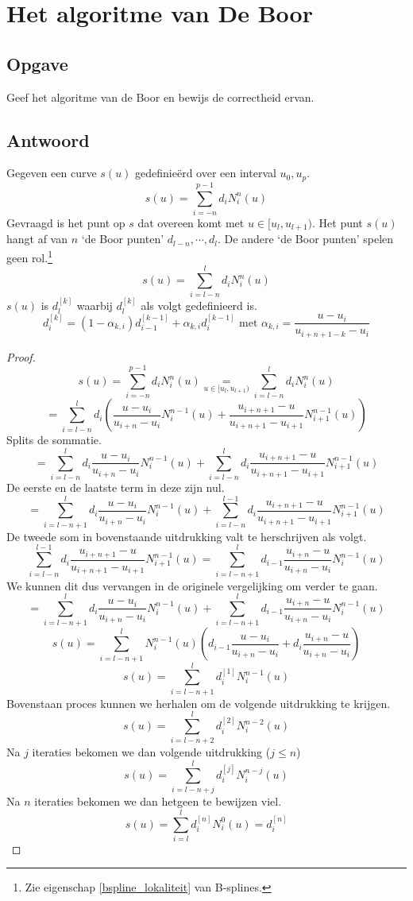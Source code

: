 \documentclass[examenvragen.tex]{subfiles}
\begin{document}
\section{Het algoritme van De Boor}
\subsection{Opgave}
Geef het algoritme van de Boor en bewijs de correctheid ervan.

\subsection{Antwoord}

Gegeven een curve $s(u)$ gedefinie\"erd over een interval $u_0,u_p$. 
\[
s(u) = \sum_{i=-n}^{p-1}d_iN_{i}^{n}(u)
\]
Gevraagd is het punt op $s$ dat overeen komt met $u\in [u_l,u_{l+1})$. Het punt $s(u)$ hangt af van $n$ `de Boor punten' $d_{l-n},\cdots,d_{l}$. De andere `de Boor punten' spelen geen rol.\footnote{Zie eigenschap \ref{bspline_lokaliteit} van B-splines.}
\[
s(u) = \sum_{i=l-n}^{l}d_{i}N_{i}^{n}(u)
\]
$s(u)$ is $d_{l}^{[k]}$ waarbij $d_{l}^{[k]}$ als volgt gedefinieerd is.
\[
d_{i}^{[k]}
= (1-\alpha_{k,i})d_{i-1}^{[k-1]}
+ \alpha_{k,i}d_{i}^{[k-1]}
\text{ met }
\alpha_{k,i} = \frac{u-u_i}{u_{i+n+1-k}-u_{i}}
\]

\begin{proof}
\[
s(u)
= \sum_{i=-n}^{p-1}d_iN_{i}^{n}(u)
\underset{u \in [u_l,u_{l+1})}{=}
\sum_{i=l-n}^{l}d_iN_{i}^{n}(u)
\]
\[
=
\sum_{i=l-n}^{l}d_i
\left(
\frac{u-u_i}{u_{i+n}-u_i}N_i^{n-1}(u) + 
\frac{u_{i+n+1}-u}{u_{i+n+1}-u_{i+1}}N_{i+1}^{n-1}(u)
\right)
\]
Splits de sommatie.
\[
=
\sum_{i=l-n}^{l}d_i
\frac{u-u_i}{u_{i+n}-u_i}N_i^{n-1}(u) + 
\sum_{i=l-n}^{l}d_i
\frac{u_{i+n+1}-u}{u_{i+n+1}-u_{i+1}}N_{i+1}^{n-1}(u)
\]
De eerste en de laatste term in deze zijn nul.
\[
=
\sum_{i=l-n+1}^{l}d_i
\frac{u-u_i}{u_{i+n}-u_i}N_i^{n-1}(u) + 
\sum_{i=l-n}^{l-1}d_i
\frac{u_{i+n+1}-u}{u_{i+n+1}-u_{i+1}}N_{i+1}^{n-1}(u)
\]
De tweede som in bovenstaande uitdrukking valt te herschrijven als volgt.
\[
\sum_{i=l-n}^{l-1}d_i
\frac{u_{i+n+1}-u}{u_{i+n+1}-u_{i+1}}N_{i+1}^{n-1}(u)
=
\sum_{i=l-n+1}^{l}d_{i-1}
\frac{u_{i+n}-u}{u_{i+n}-u_{i}}N_{i}^{n-1}(u)
\]
We kunnen dit dus vervangen in de originele vergelijking om verder te gaan.
\[
=
\sum_{i=l-n+1}^{l}d_i
\frac{u-u_i}{u_{i+n}-u_i}N_i^{n-1}(u) + 
\sum_{i=l-n+1}^{l}d_{i-1}
\frac{u_{i+n}-u}{u_{i+n}-u_{i}}N_{i}^{n-1}(u)
\]
\[
s(u)
=
\sum_{i=l-n+1}^{l}
N_i^{n-1}(u)
\left(
d_{i-1}
\frac{u-u_i}{u_{i+n}-u_i} +
d_i
\frac{u_{i+n}-u}{u_{i+n}-u_{i}}
\right)
\]
\[
s(u)
= \sum_{i=l-n+1}^{l}
d_{i}^{[1]}
N_i^{n-1}(u)
\]
Bovenstaan proces kunnen we herhalen om de volgende uitdrukking te krijgen.
\[
s(u)
= \sum_{i=l-n+2}^{l}
d_{i}^{[2]}
N_i^{n-2}(u)
\]
Na $j$ iteraties bekomen we dan volgende uitdrukking ($j\le n$)
\[
s(u)
= \sum_{i=l-n+j}^{l}
d_{i}^{[j]}
N_i^{n-j}(u)
\]
Na $n$ iteraties bekomen we dan hetgeen te bewijzen viel.
\[
s(u) = \sum_{i=l}^{l}d_{i}^{[n]}N_{i}^{0}(u) = d_{i}^{[n]}
\]
\end{proof}
\end{document}
